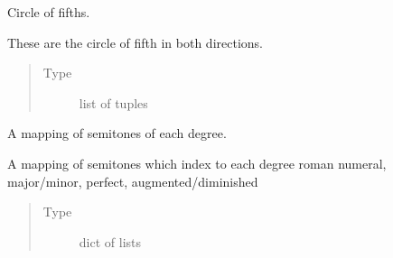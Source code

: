 \documentclass[letterpaper,10pt,english]{sphinxmanual}
\begin{document}

\begin{fulllineitems}
\label{\detokenize{birdears:birdears.CIRCLE_OF_FIFTHS}}
Circle of fifths.

These are the circle of fifth in both directions.
\begin{quote}\begin{description}
\item[{Type}] \leavevmode
list of tuples

\end{description}\end{quote}

\end{fulllineitems}


\begin{fulllineitems}
\label{\detokenize{birdears:birdears.D}}
\end{fulllineitems}


\begin{fulllineitems}
\label{\detokenize{birdears:birdears.DEGREE_INDEX}}
A mapping of semitones of each degree.

A mapping of semitones which index to each degree roman numeral, major/minor,
perfect, augmented/diminished
\begin{quote}\begin{description}
\item[{Type}] \leavevmode
dict of lists

\end{description}\end{quote}

\end{fulllineitems}
\end{document}

